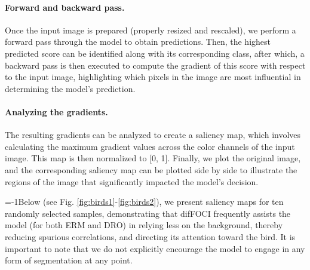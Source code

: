 \paragraph{Forward and backward pass.} Once the input image is prepared (properly resized and rescaled), we perform a forward pass through the model to obtain predictions. Then, the highest predicted score can be identified along with its corresponding class, after which, a backward pass is then executed to compute the gradient of this score with respect to the input image, highlighting which pixels in the image are most influential in determining the model's prediction.

\paragraph{Analyzing the gradients.} The resulting gradients can be analyzed to create a saliency map, which involves calculating the maximum gradient values across the color channels of the input image. This map is then normalized to [0, 1]. Finally, we plot the original image, and the corresponding saliency map can be plotted side by side to illustrate the regions of the image that significantly impacted the model's decision.

\looseness=-1Below (see Fig. \ref{fig:birds1}-\ref{fig:birds2}), we present saliency maps for ten randomly selected samples, demonstrating that difFOCI frequently assists the model (for both ERM and DRO) in relying less on the background, thereby reducing spurious correlations, and directing its attention toward the bird. It is important to note that we do not explicitly encourage the model to engage in any form of segmentation at any point.

